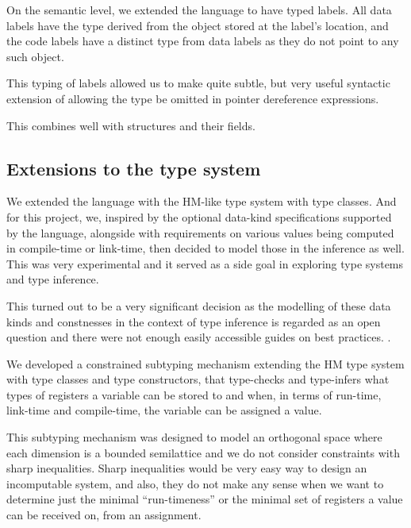 On the semantic level, we extended the language to have typed labels. All data labels have the type derived from the object stored at the label's location, and the code labels have a distinct type from data labels as they do not point to any such object.

This typing of labels allowed us to make quite subtle, but very useful syntactic extension of allowing the type be omitted in pointer dereference expressions.


This combines well with structures and their fields.



\subsection{Extensions to the type system}

We extended the language with the HM-like type system with type classes. And for this project, we, inspired by the optional data-kind specifications supported by the \cmm language, alongside with requirements on various values being computed in compile-time or link-time, then decided to model those in the inference as well. This was very experimental and it served as a side goal in exploring type systems and type inference.

This turned out to be a very significant decision as the modelling of these data kinds and constnesses in the context of type inference is regarded as an open question and there were not enough easily accessible guides on best practices. .

We developed a constrained subtyping mechanism extending the HM type system with type classes and type constructors, that type-checks and type-infers what types of registers a variable can be stored to and when, in terms of run-time, link-time and compile-time, the variable can be assigned a value.

This subtyping mechanism was designed to model an orthogonal space where each dimension is a bounded semilattice and we do not consider constraints with sharp inequalities. Sharp inequalities would be very easy way to design an incomputable system, and also, they do not make any sense when we want to determine just the minimal ``run-timeness''  or the minimal set of registers a value can be received on, from an assignment.

